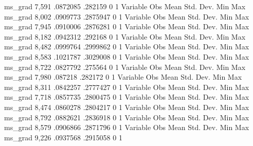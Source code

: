      ms_grad {\VBAR}      7,591    .0872085     .282159          0          1
{\smallskip}
    Variable {\VBAR}        Obs        Mean    Std. Dev.       Min        Max
     ms_grad {\VBAR}      8,002    .0909773    .2875947          0          1
{\smallskip}
    Variable {\VBAR}        Obs        Mean    Std. Dev.       Min        Max
     ms_grad {\VBAR}      7,945    .0910006    .2876281          0          1
{\smallskip}
    Variable {\VBAR}        Obs        Mean    Std. Dev.       Min        Max
     ms_grad {\VBAR}      8,182    .0942312     .292168          0          1
{\smallskip}
    Variable {\VBAR}        Obs        Mean    Std. Dev.       Min        Max
     ms_grad {\VBAR}      8,482    .0999764    .2999862          0          1
{\smallskip}
    Variable {\VBAR}        Obs        Mean    Std. Dev.       Min        Max
     ms_grad {\VBAR}      8,583    .1021787    .3029008          0          1
{\smallskip}
    Variable {\VBAR}        Obs        Mean    Std. Dev.       Min        Max
     ms_grad {\VBAR}      8,722    .0827792     .275564          0          1
{\smallskip}
    Variable {\VBAR}        Obs        Mean    Std. Dev.       Min        Max
     ms_grad {\VBAR}      7,980     .087218     .282172          0          1
{\smallskip}
    Variable {\VBAR}        Obs        Mean    Std. Dev.       Min        Max
     ms_grad {\VBAR}      8,311    .0842257    .2777427          0          1
{\smallskip}
    Variable {\VBAR}        Obs        Mean    Std. Dev.       Min        Max
     ms_grad {\VBAR}      7,718    .0857735    .2800475          0          1
{\smallskip}
    Variable {\VBAR}        Obs        Mean    Std. Dev.       Min        Max
     ms_grad {\VBAR}      8,474    .0860278    .2804217          0          1
{\smallskip}
    Variable {\VBAR}        Obs        Mean    Std. Dev.       Min        Max
     ms_grad {\VBAR}      8,792    .0882621    .2836918          0          1
{\smallskip}
    Variable {\VBAR}        Obs        Mean    Std. Dev.       Min        Max
     ms_grad {\VBAR}      8,579    .0906866    .2871796          0          1
{\smallskip}
    Variable {\VBAR}        Obs        Mean    Std. Dev.       Min        Max
     ms_grad {\VBAR}      9,226    .0937568    .2915058          0          1
